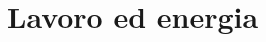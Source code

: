 \documentclass[../../fisica]{subfiles}
\begin{document}
    \chapter{Lavoro ed energia}


%        
%           
%
%
%

        \renewcommand{\arraystretch}{1.5}
\end{document}

